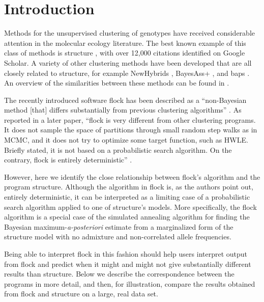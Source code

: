 
\section*{Introduction}
Methods for the unsupervised clustering of genotypes have received 
considerable attention in the molecular ecology literature.  
The best known example of this class of methods is {\sc structure} 
\citep{Pritchardetal2000}, with over 12,000 citations identified on 
Google Scholar.  A variety of other 
clustering methods have been developed that are all closely related to 
{\sc structure}, for example {\sc NewHybrids} \citep{And&Tho2002}, {\sc 
BayesAss+} \citep{Wil&Ran2003}, and {\sc baps} 
\citep{Coranderetal2004}. An overview of the similarities between these methods can be 
found in \citet{Anderson2009PGAC}.

The recently introduced software {\sc flock} \citep{Duc&Tur2009} has
been described
as a ``non-Bayesian method [that] 
differs substantially from previous 
clustering algorithms'' \citep[][p.~1333]{Duc&Tur2009}. As reported
in a later paper, ``{\sc flock} is very different from  other clustering 
programs. It does not sample the space of partitions through small 
random step walks as in MCMC, and it does not try to optimize some 
target function, such as HWLE\@. Briefly stated, it is not based on a 
probabilistic search algorithm. On the contrary, {\sc flock} is 
entirely deterministic'' \citep[][p.~736]{Duc&Tur2012}.

However, here we identify 
the close relationship between {\sc flock}'s algorithm and the program
{\sc structure}.  Although the algorithm in {\sc flock}
is, as the authors point out, entirely deterministic, it can be interpreted as a 
limiting case of a probabilistic search algorithm applied to one of {\sc structure}'s
models.  More specifically, the {\sc flock} 
algorithm is a special case of the simulated annealing
algorithm for finding the Bayesian maximum-{\em a-posteriori}
estimate from a marginalized form of the {\sc structure} model with no
admixture and non-correlated allele frequencies.  

Being able to interpret {\sc flock} in this fashion should help users
interpret output from {\sc flock} and predict when it might and might not
give substantially different results than {\sc structure}. Below we describe
the correspondence between the programs in more detail, and then, for illustration, compare
the results obtained from {\sc flock} and {\sc structure} on a large, real data
set.

